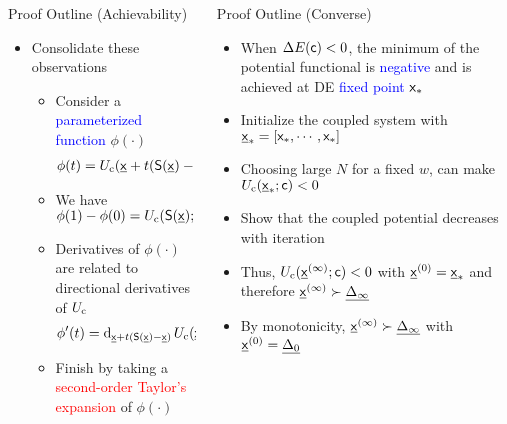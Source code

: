 \documentclass{beamer}
\newlength{\twocolwid}
\newlength{\threecolwid}
\begin{document}
\begin{columns}[t]
\begin{column}{\twocolwid}
\begin{block}{Proof Outline (Achievability)}
\begin{itemize}
    \vspace{0.4cm}
  \item Consolidate these observations
    \begin{itemize}
    \item Consider a \textcolor{blue}{parameterized function} $\phi(\cdot)$
      \begin{align*}
        \phi(t)=U_\mathrm{c}(\underline{\mathsf{x}} + t (\mathsf{S}(\underline{\mathsf{x}}) - \underline{\mathsf{x}}) ; \mathsf{c})
      \end{align*}
    \item We have $\phi(1)-\phi(0) = U_\mathrm{c}(\mathsf{S}(\underline{\mathsf{x}}) ; \mathsf{c}) - U_\mathrm{c}(\underline{\mathsf{x}} ; \mathsf{c})$
      \vspace{0.25cm}
    \item Derivatives of $\phi(\cdot)$ are related to directional derivatives of $U_\mathrm{c}$
      \begin{align*}
        \phi'(t) &= \mathrm{d}_{ \underline{\mathsf{x}} + t (\mathsf{S}(\underline{\mathsf{x}}) - \underline{\mathsf{x}}) }\hspace{0.05cm} U_\mathrm{c}( \underline{\mathsf{x}} + t (\mathsf{S}(\underline{\mathsf{x}}) - \underline{\mathsf{x}}) ; \mathsf{c})[\mathsf{S}(\underline{\mathsf{x}}) - \underline{\mathsf{x}}] 
      \end{align*}
    \item Finish by taking a \textcolor{red}{second-order Taylor's expansion} of $\phi(\cdot)$
    \end{itemize}
  \end{itemize}
\end{block}
\end{column}

\begin{column}{\threecolwid}
\begin{block}{Proof Outline (Converse)}
  \begin{itemize}
  \vspace{0.3cm}\item When $\Delta E(\mathsf{c}) < 0$, the minimum of the potential functional is \textcolor{blue}{negative} and is achieved at DE \textcolor{blue}{fixed point} $\mathsf{x}_*$
  \vspace{0.3cm}\item Initialize the coupled system with $\underline{\mathsf{x}}_*=[\mathsf{x}_*,\cdots,\mathsf{x}_*]$
  \vspace{0.3cm}\item Choosing large $N$ for a fixed $w$, can make $U_\mathrm{c}(\underline{\mathsf{x}}_*;\mathsf{c})<0$
  \vspace{0.3cm}\item Show that the coupled potential decreases with iteration
  \vspace{0.3cm}\item Thus, $U_\mathrm{c}(\underline{\mathsf{x}}^{(\infty)} ; \mathsf{c}) < 0$ with $\underline{\mathsf{x}}^{(0)}=\underline{\mathsf{x}}_*$ and therefore $\underline{\mathsf{x}}^{(\infty)} \succ \underline{\Delta_\infty}$
  \item By monotonicity, $\underline{\mathsf{x}}^{(\infty)} \succ \underline{\Delta_\infty}$ with $\underline{\mathsf{x}}^{(0)}=\underline{\Delta_0}$
  \end{itemize}
\end{block}


\end{column}
\end{columns}
\end{document}
